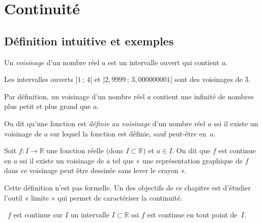 \documentclass[a4paper,12pt]{article}
\begin{document}
\newpage
\section{Continuité}
\subsection{Définition intuitive et exemples}
\label{sec:continuite}
\begin{definition}
	\tcblower
	Un \emph{voisinage} d'un nombre réel $a$ est un intervalle ouvert qui contient $a$.
\end{definition}
\begin{exemple}
	\tcblower
		Les intervalles ouverts $]1\,{;}\,4[$ et $]2{,}9999\,{;}\,3{,}000000001[$ sont des voisinages de $3$.
\end{exemple}
\begin{remarque}
	\tcblower
 Par définition, un voisinage d'un nombre réel $a$ contient une infinité de nombres plus petit et plus grand que $a$. 
\end{remarque}
\begin{definition}
	\tcblower
	On dit qu'une fonction est \emph{définie au voisinage} d'un nombre réel $a$ ssi il existe un voisinage de $a$ sur lequel la fonction est définie, sauf peut-être en~$a$.
\end{definition}

\begin{definition}
\tcblower
Soit $f : I \to \mathbb{R}$ une fonction réelle (donc $I \subset \mathbb{R}$) et $a \in I$.  
On dit que $f$ est continue en $a$ ssi il existe un voisinage de $a$ tel que « une représentation graphique de $f$ dans ce voisinage peut être dessinée sans lever le crayon ».  
\end{definition}
\begin{remarque}
	\tcblower
	Cette définition n'est pas formelle. Un des objectifs de ce chapitre est d'étudier l'outil « limite » qui permet de caractériser la continuité.
	\end{remarque}

\begin{definition}
	\tcblower
	\
	$f$ est continue sur $I$ un intervalle $I\subset \mathbb{R}$ ssi $f$ est continue en tout point de~$I$.
\end{definition}
\end{document}

